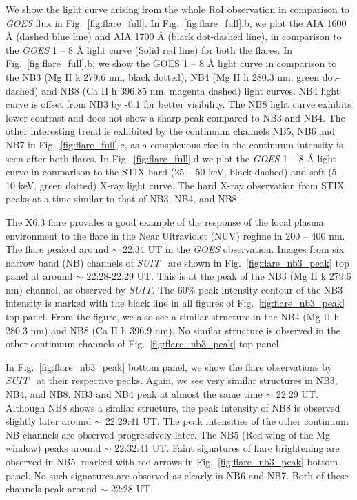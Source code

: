\documentclass[12pt]{article}
\newcommand{\suit}{{\it{SUIT}}}
\begin{document}
We show the light curve arising from the whole RoI observation in comparison to {\it GOES} flux in Fig.~\ref{fig:flare_full}. In Fig.~\ref{fig:flare_full}.b, we plot the AIA 1600 {\AA} (dashed blue line) and AIA 1700 {\AA} (black dot-dashed line), in comparison to the {\it GOES} 1 {--} 8 {\AA} light curve (Solid red line) for both the flares. In Fig.~\ref{fig:flare_full}.b, we show the GOES 1 {--} 8 {\AA} light curve in comparison to the NB3 (Mg II k 279.6 nm, black dotted), NB4 (Mg II h 280.3 nm, green dot-dashed) and NB8 (Ca II h 396.85 nm, magenta dashed) light curves. NB4 light curve is offset from NB3 by -0.1 for better visibility. The NB8 light curve exhibits lower contrast and does not show a sharp peak compared to NB3 and NB4. The other interesting trend is exhibited by the continuum channels NB5, NB6 and NB7 in Fig.~\ref{fig:flare_full}.c, as a conspicuous rise in the continuum intensity is seen after both flares. In Fig.~\ref{fig:flare_full}.d we plot the {\it GOES} 1 {--} 8 {\AA} light curve in comparison to the STIX hard (25 {--} 50 keV, black dashed) and soft (5 {--} 10 keV, green dotted) X-ray light curve. The hard X-ray observation from STIX peaks at a time similar to that of NB3, NB4, and NB8.

The X6.3 flare provides a good example of the response of the local plasma environment to the flare in the Near Ultraviolet (NUV) regime in 200 {--} 400 nm. The flare peaked around $\sim$ 22:34 UT in the {\it GOES} observation. Images from six narrow band (NB) channels of \suit~ are shown in Fig.~\ref{fig:flare_nb3_peak} top panel at around $\sim$ 22:28-22:29 UT. This is at the peak of the NB3 (Mg II k 279.6 nm) channel, as observed by \suit. The 60\% peak intensity contour of the NB3 intensity is marked with the black line in all figures of Fig.~\ref{fig:flare_nb3_peak} top panel. From the figure, we also see a similar structure in the NB4 (Mg II h 280.3 nm) and NB8 (Ca II h 396.9 nm). No similar structure is observed in the other continuum channels of Fig.~\ref{fig:flare_nb3_peak} top panel.

In Fig.~\ref{fig:flare_nb3_peak} bottom panel, we show the flare observations by \suit~ at their respective peaks. Again, we see very similar structures in NB3, NB4, and NB8. NB3 and NB4 peak at almost the same time $\sim$ 22:29 UT. Although NB8 shows a similar structure, the peak intensity of NB8 is observed slightly later around $\sim$ 22:29:41 UT. The peak intensities of the other continuum NB channels are observed progressively later. The NB5 (Red wing of the Mg window) peaks around $\sim$ 22:32:41 UT. Faint signatures of flare brightening are observed in NB5, marked with red arrows in Fig.~\ref{fig:flare_nb3_peak} bottom panel. No such signatures are observed as clearly in NB6 and NB7. Both of these channels peak around $\sim$ 22:28 UT.
\end{document}
